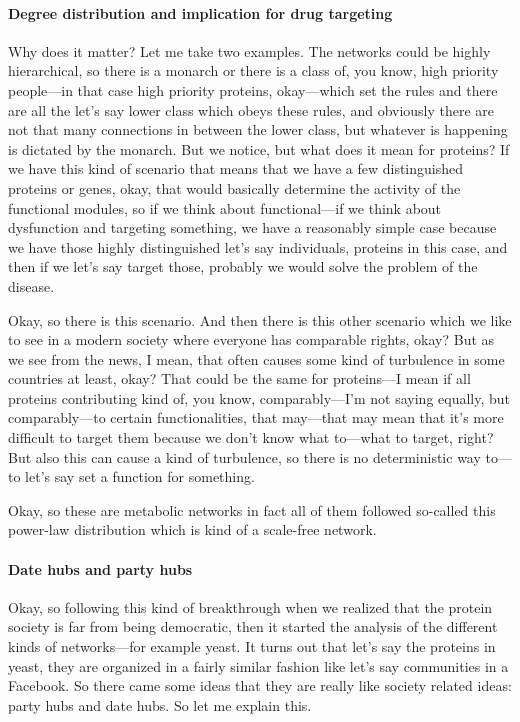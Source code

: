 \paragraph{Degree distribution and implication for drug targeting}
Why does it matter? Let me take two examples. The networks could be highly hierarchical, so there is a monarch or there is a class of, you know, high priority people—in that case high priority proteins, okay—which set the rules and there are all the let’s say lower class which obeys these rules, and obviously there are not that many connections in between the lower class, but whatever is happening is dictated by the monarch. But we notice, but what does it mean for proteins? If we have this kind of scenario that means that we have a few distinguished proteins or genes, okay, that would basically determine the activity of the functional modules, so if we think about functional—if we think about dysfunction and targeting something, we have a reasonably simple case because we have those highly distinguished let’s say individuals, proteins in this case, and then if we let’s say target those, probably we would solve the problem of the disease.

Okay, so there is this scenario. And then there is this other scenario which we like to see in a modern society where everyone has comparable rights, okay? But as we see from the news, I mean, that often causes some kind of turbulence in some countries at least, okay? That could be the same for proteins—I mean if all proteins contributing kind of, you know, comparably—I’m not saying equally, but comparably—to certain functionalities, that may—that may mean that it’s more difficult to target them because we don’t know what to—what to target, right? But also this can cause a kind of turbulence, so there is no deterministic way to—to let’s say set a function for something.

Okay, so these are metabolic networks in fact all of them followed so-called this power-law distribution which is kind of a scale-free network.

\paragraph{Date hubs and party hubs}
Okay, so following this kind of breakthrough when we realized that the protein society is far from being democratic, then it started the analysis of the different kinds of networks—for example yeast. It turns out that let’s say the proteins in yeast, they are organized in a fairly similar fashion like let’s say communities in a Facebook. So there came some ideas that they are really like society related ideas: party hubs and date hubs. So let me explain this.

